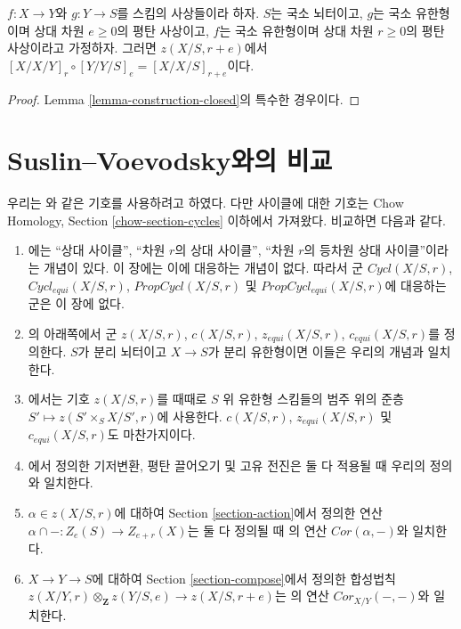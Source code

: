 \begin{lemma}
\label{lemma-composition-fundamental-cycles}
$f : X \to Y$와 $g : Y \to S$를 스킴의 사상들이라 하자. $S$는 국소
뇌터이고, $g$는 국소 유한형이며 상대 차원 $e \ge 0$의 평탄
사상이고, $f$는 국소 유한형이며 상대 차원 $r \geq 0$의 평탄
사상이라고 가정하자. 그러면 $z(X/S, r + e)$에서
$[X/X/Y]_r \circ [Y/Y/S]_e = [X/X/S]_{r + e}$이다.
\end{lemma}

\begin{proof}
Lemma \ref{lemma-construction-closed}의 특수한 경우이다.
\end{proof}



\section{Suslin--Voevodsky와의 비교}
\label{section-compare}

\noindent
우리는 \cite{SV}와 같은 기호를 사용하려고 하였다. 다만 사이클에
대한 기호는 Chow Homology, Section \ref{chow-section-cycles} 이하에서
가져왔다. 비교하면 다음과 같다.
\begin{enumerate}
\item \cite[Section 3.1]{SV}에는 ``상대 사이클'', ``차원 $r$의 상대
사이클'', ``차원 $r$의 등차원 상대 사이클''이라는 개념이 있다.
이 장에는 이에 대응하는 개념이 없다. 따라서 군
$Cycl(X/S, r)$, $Cycl_{equi}(X/S, r)$,
$PropCycl(X/S, r)$ 및 $PropCycl_{equi}(X/S, r)$에 대응하는 군은 이
장에 없다.
\item \cite[page 36]{SV}의 아래쪽에서 군
$z(X/S, r)$, $c(X/S, r)$, $z_{equi}(X/S, r)$, $c_{equi}(X/S, r)$를
정의한다. $S$가 분리 뇌터이고 $X \to S$가 분리 유한형이면 이들은
우리의 개념과 일치한다.
\item \cite{SV}에서는 기호 $z(X/S, r)$를 때때로 $S$ 위 유한형
스킴들의 범주 위의 준층 $S' \mapsto z(S' \times_S X/S', r)$에
사용한다. $c(X/S, r)$, $z_{equi}(X/S, r)$ 및 $c_{equi}(X/S, r)$도
마찬가지이다.
\item \cite{SV}에서 정의한 기저변환, 평탄 끌어오기 및 고유 전진은
둘 다 적용될 때 우리의 정의와 일치한다.
\item $\alpha \in z(X/S, r)$에 대하여 Section \ref{section-action}에서
정의한 연산 $\alpha \cap - : Z_e(S) \to Z_{e + r}(X)$는 둘 다 정의될
때 \cite[Section 3.7]{SV}의 연산 $Cor(\alpha, -)$와 일치한다.
\item $X \to Y \to S$에 대하여 Section \ref{section-compose}에서
정의한 합성법칙
$z(X/Y, r) \otimes_\mathbf{Z} z(Y/S, e) \longrightarrow z(X/S, r + e)$는
\cite[Corollary 3.7.5]{SV}의 연산 $Cor_{X/Y}(-, -)$와 일치한다.
\end{enumerate}










